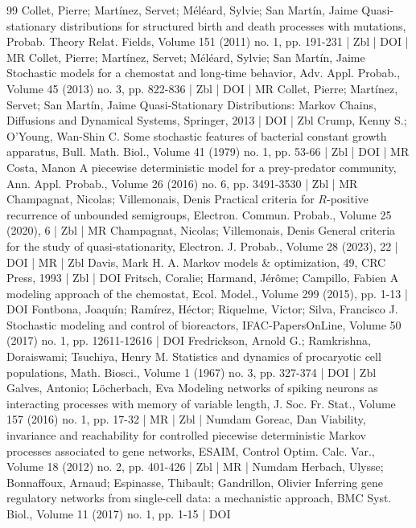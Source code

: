 \documentclass[10pt]{amsart}
\theoremstyle{definition}\newtheorem{defi}[theo]{Definition}\newtheorem{rema}[theo]{Remark}\newtheorem{exam}[theo]{Example}\newtheorem{exem}[theo]{Example}\newtheorem{nota}[theo]{Notation}
\newcommand{\1}{\mathbf{1}}
\begin{document}
\begin{thebibliography}{99}
 Collet, Pierre; Martínez, Servet; Méléard, Sylvie; San Martín, Jaime Quasi-stationary distributions for structured birth and death processes with mutations, Probab. Theory Relat. Fields, Volume 151 (2011) no. 1, pp. 191-231 | Zbl | DOI | MR
 Collet, Pierre; Martínez, Servet; Méléard, Sylvie; San Martín, Jaime Stochastic models for a chemostat and long-time behavior, Adv. Appl. Probab., Volume 45 (2013) no. 3, pp. 822-836 | Zbl | DOI | MR
 Collet, Pierre; Martínez, Servet; San Martín, Jaime Quasi-Stationary Distributions: Markov Chains, Diffusions and Dynamical Systems, Springer, 2013 | DOI | Zbl
 Crump, Kenny S.; O’Young, Wan-Shin C. Some stochastic features of bacterial constant growth apparatus, Bull. Math. Biol., Volume 41 (1979) no. 1, pp. 53-66 | Zbl | DOI | MR
 Costa, Manon A piecewise deterministic model for a prey-predator community, Ann. Appl. Probab., Volume 26 (2016) no. 6, pp. 3491-3530 | Zbl | MR
 Champagnat, Nicolas; Villemonais, Denis Practical criteria for ${R}$-positive recurrence of unbounded semigroups, Electron. Commun. Probab., Volume 25 (2020), 6 | Zbl | MR
 Champagnat, Nicolas; Villemonais, Denis General criteria for the study of quasi-stationarity, Electron. J. Probab., Volume 28 (2023), 22 | DOI | MR | Zbl
 Davis, Mark H. A. Markov models \& optimization, 49, CRC Press, 1993 | Zbl | DOI
 Fritsch, Coralie; Harmand, Jérôme; Campillo, Fabien A modeling approach of the chemostat, Ecol. Model., Volume 299 (2015), pp. 1-13 | DOI
 Fontbona, Joaquín; Ramírez, Héctor; Riquelme, Victor; Silva, Francisco J. Stochastic modeling and control of bioreactors, IFAC-PapersOnLine, Volume 50 (2017) no. 1, pp. 12611-12616 | DOI
 Fredrickson, Arnold G.; Ramkrishna, Doraiswami; Tsuchiya, Henry M. Statistics and dynamics of procaryotic cell populations, Math. Biosci., Volume 1 (1967) no. 3, pp. 327-374 | DOI | Zbl
 Galves, Antonio; Löcherbach, Eva Modeling networks of spiking neurons as interacting processes with memory of variable length, J. Soc. Fr. Stat., Volume 157 (2016) no. 1, pp. 17-32 | MR | Zbl | Numdam
 Goreac, Dan Viability, invariance and reachability for controlled piecewise deterministic Markov processes associated to gene networks, ESAIM, Control Optim. Calc. Var., Volume 18 (2012) no. 2, pp. 401-426 | Zbl | MR | Numdam
 Herbach, Ulysse; Bonnaffoux, Arnaud; Espinasse, Thibault; Gandrillon, Olivier Inferring gene regulatory networks from single-cell data: a mechanistic approach, BMC Syst. Biol., Volume 11 (2017) no. 1, pp. 1-15 | DOI

\end{thebibliography}
\end{document}
